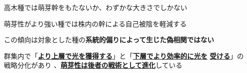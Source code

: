 \documentclass[a0, 30pt, plainboxedsections]{sciposter} %
\begin{document}
\begin{multicols}{2}
\begin{mdframed}[style=conclusion.frame,frametitle={\textbf{\Large{\faFlagAlt \vspace{0.02em} 結論: {萌芽性は樹高と背反的に進化しており、\\\hspace*{2.8em}群集の中に多様な萌芽性をもつ種が存在する}}}}]
{    \faCaretRight 高木種では萌芽幹をもたないか、わずかな大きさでしかない
    
    \faCaretRight 萌芽性がより強い種では株内の幹による自己被陰を軽減する
    
    \faCaretRight この傾向は対象とした種の\textbf{系統的偏りによって生じた偽相関ではない}
  }
  
  \vspace{0.4em}
  \faHandLeft 群集内で「\textbf{\underline{より上層で光を獲得する}}」と「\textbf{\underline{下層でより効率的に光を}} \textbf{\underline{受ける}}」の戦略分化があり
  、\textbf{\underline{萌芽性は後者の戦術として進化}}している
 
\end{mdframed}

\end{multicols}
\begin{mdframed}[style=section.frame]
  \centering\LARGE\textbf{\color{white}{方法}}
\end{mdframed}\vspace{-1.2em}
\end{document}
